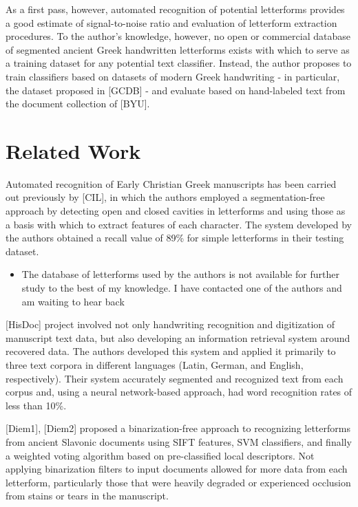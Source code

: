 \documentclass[10pt,twocolumn,letterpaper]{article}
\begin{document}
As a first pass, however, automated recognition of potential letterforms provides a good estimate of signal-to-noise ratio and evaluation of letterform extraction procedures. To the author’s knowledge, however, no open or commercial database of segmented ancient Greek handwritten letterforms exists with which to serve as a training dataset for any potential text classifier. Instead, the author proposes to train classifiers based on datasets of modern Greek handwriting - in particular, the dataset proposed in [GCDB] - and evaluate based on hand-labeled text from the document collection of [BYU].

\section{Related Work}

Automated recognition of Early Christian Greek manuscripts has been carried out previously by [CIL], in which the authors employed a segmentation-free approach by detecting open and closed cavities in letterforms and using those as a basis with which to extract features of each character. The system developed by the authors obtained a recall value of 89\% for simple letterforms in their testing dataset.
\begin{itemize}
    \item The database of letterforms used by the authors is not available for further study to the best of my knowledge. I have contacted one of the authors and am waiting to hear back
\end{itemize}

[HisDoc] project involved not only handwriting recognition and digitization of manuscript text data, but also developing an information retrieval system around recovered data. The authors developed this system and applied it primarily to three text corpora in different languages (Latin, German, and English, respectively). Their system accurately segmented and recognized text from each corpus and, using a neural network-based approach, had word recognition rates of less than 10\%.

[Diem1], [Diem2] proposed a binarization-free approach to recognizing letterforms from ancient Slavonic documents using SIFT features, SVM classifiers, and finally a weighted voting algorithm based on pre-classified local descriptors. Not applying binarization filters to input documents allowed for more data from each letterform, particularly those that were heavily degraded or experienced occlusion from stains or tears in the manuscript.
\end{document}
